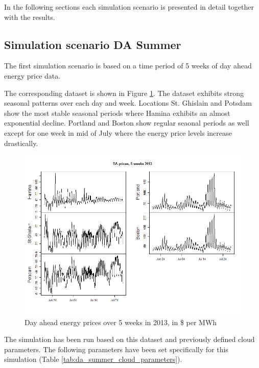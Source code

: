 In the following sections each simulation scenario is presented in detail together with the results. 



\subsection{Simulation scenario DA Summer} \label{ssec:simulation_scenario_da_summer}

The first simulation scenario is based on a time period of 5 weeks of day ahead energy price data. 

The corresponding dataset is shown in Figure \ref{fig:da_sim_2013_5weeks}. The dataset exhibits strong seasonal patterns over each day and week. Locations St. Ghislain and Potsdam show the most stable seasonal periods where Hamina exhibits an almost exponential decline. Portland and Boston show regular seaonal periods as well except for one week in mid of July where the energy price levels increase drastically. 

\begin{figure}[htbp]
	\centering
		\includegraphics[width=1.0\textwidth]{figures/evaluation_and_results/da_sim_2013_5weeks.png}
	\caption{Day ahead energy prices over 5 weeks in 2013, in \$ per MWh}
	\label{fig:da_sim_2013_5weeks}
\end{figure}

The simulation has been run based on this dataset and previously defined cloud parameters. 
The following parameters have been set specifically for this simulation (Table \ref{tab:da_summer_cloud_parameters}). 


